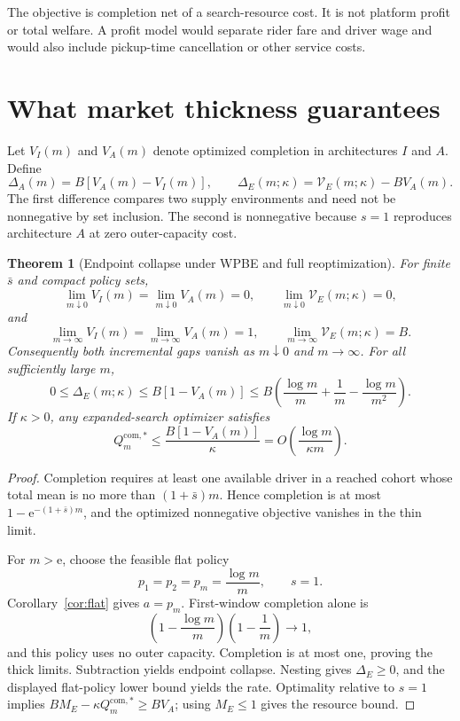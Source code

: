 \documentclass[11pt]{article}
\newtheorem{theorem}{Theorem}
\theoremstyle{definition}
\theoremstyle{remark}
\newcommand{\e}{\mathrm e}
\newcommand{\com}{\mathrm{com}}
\begin{document}
The objective is completion net of a search-resource cost.  It is not
platform profit or total welfare.  A profit model would separate rider fare
and driver wage and would also include pickup-time cancellation or other
service costs.

\section{What market thickness guarantees}

Let $V_I(m)$ and $V_A(m)$ denote optimized completion in architectures $I$
and $A$.  Define
\[
\Delta_A(m)=B[V_A(m)-V_I(m)],
\qquad
\Delta_E(m;\kappa)=\mathcal V_E(m;\kappa)-BV_A(m).
\]
The first difference compares two supply environments and need not be
nonnegative by set inclusion.  The second is nonnegative because $s=1$
reproduces architecture $A$ at zero outer-capacity cost.

\begin{theorem}[Endpoint collapse under WPBE and full reoptimization]
\label{thm:endpoint}
For finite $\bar s$ and compact policy sets,
\[
\lim_{m\downarrow0}V_I(m)=\lim_{m\downarrow0}V_A(m)=0,
\qquad
\lim_{m\downarrow0}\mathcal V_E(m;\kappa)=0,
\]
and
\[
\lim_{m\to\infty}V_I(m)=\lim_{m\to\infty}V_A(m)=1,
\qquad
\lim_{m\to\infty}\mathcal V_E(m;\kappa)=B.
\]
Consequently both incremental gaps vanish as $m\downarrow0$ and
$m\to\infty$.  For all sufficiently large $m$,
\[
0\le\Delta_E(m;\kappa)
\le B[1-V_A(m)]
\le B\left(\frac{\log m}{m}+\frac1m-
\frac{\log m}{m^2}\right).
\]
If $\kappa>0$, any expanded-search optimizer satisfies
\[
Q_m^{\com,*}
\le\frac{B[1-V_A(m)]}{\kappa}
=O\!\left(\frac{\log m}{\kappa m}\right).
\]
\end{theorem}

\begin{proof}
Completion requires at least one available driver in a reached cohort whose
total mean is no more than $(1+\bar s)m$.  Hence completion is at most
$1-\e^{-(1+\bar s)m}$, and the optimized nonnegative objective vanishes in
the thin limit.

For $m>\e$, choose the feasible flat policy
\[
p_1=p_2=p_m=\frac{\log m}{m},\qquad s=1.
\]
Corollary~\ref{cor:flat} gives $a=p_m$.  First-window completion alone is
\[
\left(1-\frac{\log m}{m}\right)
\left(1-\frac1m\right)\longrightarrow1,
\]
and this policy uses no outer capacity.  Completion is at most one, proving
the thick limits.  Subtraction yields endpoint collapse.  Nesting gives
$\Delta_E\ge0$, and the displayed flat-policy lower bound yields the rate.
Optimality relative to $s=1$ implies
$BM_E-\kappa Q_m^{\com,*}\ge BV_A$; using $M_E\le1$ gives the resource bound.
\end{proof}
\end{document}

